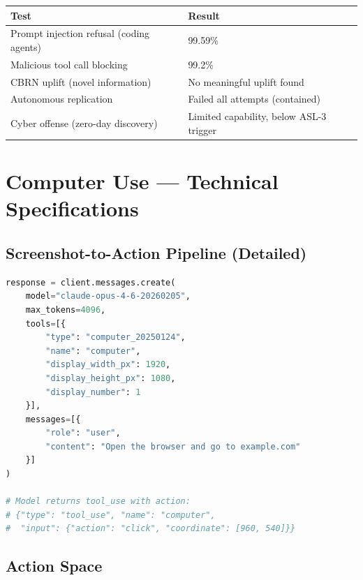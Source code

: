 \documentclass[11pt,a4paper]{article}
\begin{document}
\begin{center}
\begin{tabular}{ll}
\toprule
\textbf{Test} & \textbf{Result} \\
\midrule
Prompt injection refusal (coding agents) & 99.59\% \\
Malicious tool call blocking & 99.2\% \\
CBRN uplift (novel information) & No meaningful uplift found \\
Autonomous replication & Failed all attempts (contained) \\
Cyber offense (zero-day discovery) & Limited capability, below ASL-3 trigger \\
\bottomrule
\end{tabular}
\end{center}

\section{Computer Use --- Technical Specifications}

\subsection{Screenshot-to-Action Pipeline (Detailed)}

\begin{lstlisting}[language=Python, caption={Computer Use API Call}]
response = client.messages.create(
    model="claude-opus-4-6-20260205",
    max_tokens=4096,
    tools=[{
        "type": "computer_20250124",
        "name": "computer",
        "display_width_px": 1920,
        "display_height_px": 1080,
        "display_number": 1
    }],
    messages=[{
        "role": "user",
        "content": "Open the browser and go to example.com"
    }]
)

# Model returns tool_use with action:
# {"type": "tool_use", "name": "computer",
#  "input": {"action": "click", "coordinate": [960, 540]}}
\end{lstlisting}

\subsection{Action Space}
\end{document}
